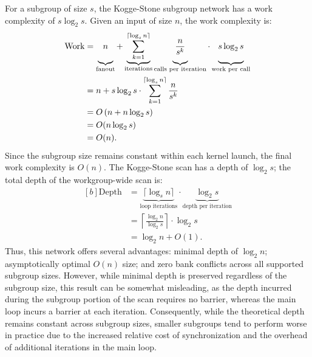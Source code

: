 \documentclass[sigconf,screen]{acmart}
\begin{document}
For a subgroup of size $s$, the Kogge-Stone subgroup network has a work complexity of $s \log_2 s$. Given an input of size $n$, the work complexity is:
\begin{equation}
  \begin{aligned}[b]
    \text{Work} & = \underbrace{\vphantom{\sum_{k=0}^{\lceil \log_s n \rceil}}n}_{\text{fanout}}
    +
    \underbrace{\sum_{k=1}^{\lceil \log_s n \rceil}}_{\text{iterations}}
    \underbrace{\vphantom{\sum_{k=1}^{\lceil \log_s n \rceil}}\frac{n}{s^k}}_{\text{calls per iteration}}
    \cdot
    \underbrace{\vphantom{\sum_{k=1}^{\lceil \log_s n \rceil}}s \log_2 s}_{\text{work per call}} \\
                & = n + s \log_2 s \cdot \sum_{k=1}^{\lceil \log_s n \rceil} \frac{n}{s^k}       \\
                & = O\left(n + n \log_2 s\right)                                                 \\
                & = O(n \log_2 s)                                                                \\
                & = O(n).
  \end{aligned}
\end{equation}
Since the subgroup size remains constant within each kernel launch, the final work complexity is $O(n)$. The Kogge-Stone scan has a depth of $\log_2 s$; the total depth of the workgroup-wide scan is:
\begin{equation}
  \begin{aligned}[b]
    \text{Depth} & = \underbrace{\lceil \log_s n \rceil}_{\text{loop iterations}}
    \cdot \underbrace{\log_2 s}_{\text{depth per iteration}}                           \\
                 & = \left\lceil \frac{\log_2 n}{\log_2 s} \right\rceil \cdot \log_2 s \\
                 & = \log_2 n + O(1).
  \end{aligned}
\end{equation}
Thus, this network offers several advantages: minimal depth of $\log_2 n$; asymptotically optimal $O(n)$ size; and zero bank conflicts across all supported subgroup sizes. However, while minimal depth is preserved regardless of the subgroup size, this result can be somewhat misleading, as the depth incurred during the subgroup portion of the scan requires no barrier, whereas the main loop incurs a barrier at each iteration. Consequently, while the theoretical depth remains constant across subgroup sizes, smaller subgroups tend to perform worse in practice due to the increased relative cost of synchronization and the overhead of additional iterations in the main loop.
\end{document}
